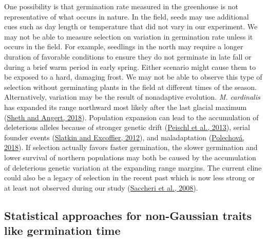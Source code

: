 \documentclass[
  12pt,
]{article}
\begin{document}
One possibility is that germination rate measured in the greenhouse is not representative of what occurs in nature. In the field, seeds may use additional cues such as day length or temperature that did not vary in our experiment. We may not be able to measure selection on variation in germination rate unless it occurs in the field. For example, seedlings in the north may require a longer duration of favorable conditions to ensure they do not germinate in late fall or during a brief warm period in early spring. Either scenario might cause them to be exposed to a hard, damaging frost. We may not be able to observe this type of selection without germinating plants in the field at different times of the season. Alternatively, variation may be the result of nonadaptive evolution. \emph{M. cardinalis} has expanded its range northward most likely after the last glacial maximum (\protect\hyperlink{ref-sheth_demographic_2018}{Sheth and Angert, 2018}). Population expansion can lead to the accumulation of deleterious alleles because of stronger genetic drift (\protect\hyperlink{ref-peischl_accumulation_2013}{Peischl et al., 2013}), serial founder events (\protect\hyperlink{ref-slatkin_serial_2012}{Slatkin and Excoffier, 2012}), and maladaptation (\protect\hyperlink{ref-polechova_is_2018}{Polechová, 2018}). If selection actually favors faster germination, the slower germination and lower survival of northern populations may both be caused by the accumulation of deleterious genetic variation at the expanding range margins. The current cline could also be a legacy of selection in the recent past which is now less strong or at least not observed during our study (\protect\hyperlink{ref-saccheri_selection_2008}{Saccheri et al., 2008}).

\hypertarget{statistical-approaches-for-non-gaussian-traits-like-germination-time}{%
\subsection{Statistical approaches for non-Gaussian traits like germination time}\label{statistical-approaches-for-non-gaussian-traits-like-germination-time}}
\end{document}

